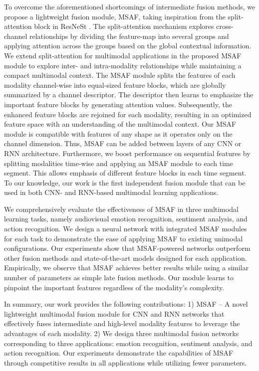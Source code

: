 \documentclass[10pt,twocolumn,letterpaper]{article}
\begin{document}
To overcome the aforementioned shortcomings of intermediate fusion methods, we propose a lightweight fusion module, MSAF, taking inspiration from the split-attention block in ResNeSt \cite{zhang2020resnest}. The split-attention mechanism explores cross-channel relationships by dividing the feature-map into several groups and applying attention across the groups based on the global contextual information. We extend split-attention for multimodal applications in the proposed MSAF module to explore inter- and intra-modality relationships while maintaining a compact multimodal context. The MSAF module splits the features of each modality channel-wise into equal-sized feature blocks, which are globally summarized by a channel descriptor. The descriptor then learns to emphasize the important feature blocks by generating attention values. Subsequently, the enhanced feature blocks are rejoined for each modality, resulting in an optimized feature space with an understanding of the multimodal context. Our MSAF module is compatible with features of any shape as it operates only on the channel dimension. Thus, MSAF can be added between layers of any CNN or RNN architecture. Furthermore, we boost performance on sequential features by splitting modalities time-wise and applying an MSAF module to each time segment. This allows emphasis of different feature blocks in each time segment. To our knowledge, our work is the first independent fusion module that can be used in both CNN- and RNN-based multimodal learning applications.

We comprehensively evaluate the effectiveness of MSAF in three multimodal learning tasks, namely audiovisual emotion recognition, sentiment analysis, and action recognition. We design a neural network with integrated MSAF modules for each task to demonstrate the ease of applying MSAF to existing unimodal configurations. Our experiments show that MSAF-powered networks outperform other fusion methods and state-of-the-art models designed for each application. Empirically, we observe that MSAF achieves better results while using a similar number of parameters as simple late fusion methods. Our module learns to pinpoint the important features regardless of the modality's complexity. 

In summary, our work provides the following contributions: 1) MSAF -- A novel lightweight multimodal fusion module for CNN and RNN networks that effectively fuses intermediate and high-level modality features to leverage the advantages of each modality. 2) We design three multimodal fusion networks corresponding to three applications: emotion recognition, sentiment analysis, and action recognition. Our experiments demonstrate the capabilities of MSAF through competitive results in all applications while utilizing fewer parameters.
\end{document}
